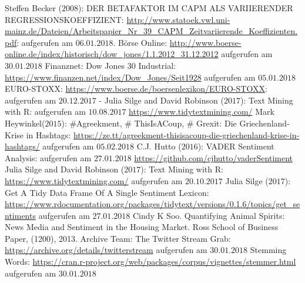 
	\newpage
	\begin{thebibliography}{12345678}	
	 Steffen Becker ($2008$): DER BETAFAKTOR IM CAPM ALS VARIIERENDER REGRESSIONSKOEFFIZIENT: \url{http://www.statoek.vwl.uni-mainz.de/Dateien/Arbeitspapier_Nr_39_CAPM_Zeitvariierende_Koeffizienten.pdf}: aufgerufen am $06.01.2018$.
	 Börse Online: \url{http://www.boerse-online.de/index/historisch/dow_jones/1.1.2012_31.12.2012} aufgerufen am $30.01.2018$
	 Finanznet: Dow Jones 30 Industrial: \url{https://www.finanzen.net/index/Dow_Jones/Seit1928} aufgerufen am $05.01.2018$	
	 EURO-STOXX: \url{https://www.boerse.de/boersenlexikon/EURO-STOXX}: aufgerufen am $20.12.2017$	
	-	Julia Silge and David Robinson ($2017$): Text Mining with R: aufgerufen am $10.08.2017$ \url{https://www.tidytextmining.com/}
	 Mark Heywinkel($2015$): \#Agreekment, \# ThisIsACoup, \# Grexit: Die Griechenland-Krise in Hashtags: \url{https://ze.tt/agreekment-thisisacoup-die-griechenland-krise-in-hashtags/}
	aufgerufen am $05.02.2018$ 
	 C.J. Hutto ($2016$): VADER Sentiment Analysis: aufgerufen am $27.01.2018$ \url{https://github.com/cjhutto/vaderSentiment}
	 Julia Silge and David Robinson ($2017$):  Text Mining with R: \url{https://www.tidytextmining.com/} aufgerufen am $20.10.2017$ 
	 Julia Silge ($2017$): Get A Tidy Data Frame Of A Single Sentiment Lexicon: \url{https://www.rdocumentation.org/packages/tidytext/versions/0.1.6/topics/get_sentiments} aufgerufen am $27.01.2018$ 
	 Cindy K Soo. Quantifying Animal Spirits: News Media and Sentiment in the Housing Market. Ross School of Business Paper, (1200), 2013.
	Archive Team: The Twitter Stream Grab:
	 \url{https://archive.org/details/twitterstream} aufgerufen am $30.01.2018$
	 Stemming Words: \url{https://cran.r-project.org/web/packages/corpus/vignettes/stemmer.html} aufgerufen am $30.01.2018$

\end{thebibliography}
\clearpage